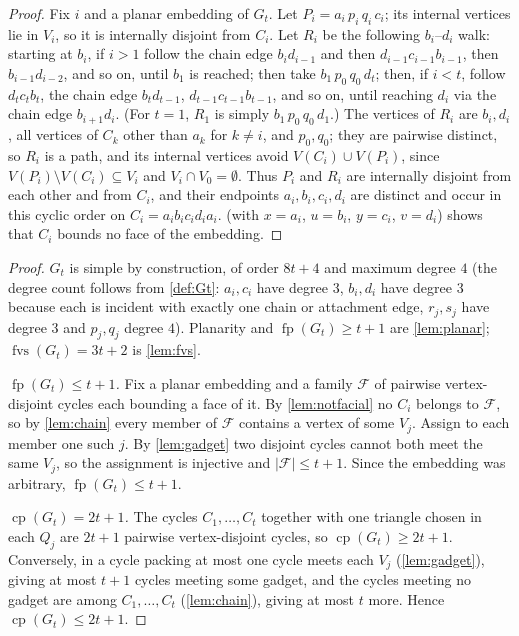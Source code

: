 \documentclass[11pt,a4paper]{article}
\theoremstyle{plain}
\theoremstyle{definition}
\theoremstyle{remark}
\newcommand{\fvs}{\operatorname{fvs}}
\newcommand{\cp}{\operatorname{cp}}
\newcommand{\fp}{\operatorname{fp}}
\newcommand{\Gtt}{G_t}
\begin{document}
\label{pf:notfacial}
\lemnotfacial*
\begin{proof}
Fix $i$ and a planar embedding of $\Gtt$. Let $P_i=a_i\,p_i\,q_i\,c_i$; its internal vertices lie in $V_i$, so it is internally disjoint from $C_i$. Let $R_i$ be the following $b_i$--$d_i$ walk: starting at $b_i$, if $i>1$ follow the chain edge $b_id_{i-1}$ and then $d_{i-1}c_{i-1}b_{i-1}$, then $b_{i-1}d_{i-2}$, and so on, until $b_1$ is reached; then take $b_1\,p_0\,q_0\,d_t$; then, if $i<t$, follow $d_tc_tb_t$, the chain edge $b_td_{t-1}$, $d_{t-1}c_{t-1}b_{t-1}$, and so on, until reaching $d_i$ via the chain edge $b_{i+1}d_i$. (For $t=1$, $R_1$ is simply $b_1\,p_0\,q_0\,d_1$.) The vertices of $R_i$ are $b_i,d_i$, all vertices of $C_k$ other than $a_k$ for $k\ne i$, and $p_0,q_0$; they are pairwise distinct, so $R_i$ is a path, and its internal vertices avoid $V(C_i)\cup V(P_i)$, since $V(P_i)\setminus V(C_i)\subseteq V_i$ and $V_i\cap V_0=\emptyset$. Thus $P_i$ and $R_i$ are internally disjoint from each other and from $C_i$, and their endpoints $a_i,b_i,c_i,d_i$ are distinct and occur in this cyclic order on $C_i=a_ib_ic_id_ia_i$.  (with $x=a_i$, $u=b_i$, $y=c_i$, $v=d_i$) shows that $C_i$ bounds no face of the embedding.
\end{proof}

\label{pf:main}
\thmmain*
\begin{proof}
$\Gtt$ is simple by construction, of order $8t+4$ and maximum degree $4$ (the degree count follows from \cref{def:Gt}: $a_i,c_i$ have degree $3$, $b_i,d_i$ have degree $3$ because each is incident with exactly one chain or attachment edge, $r_j,s_j$ have degree $3$ and $p_j,q_j$ degree $4$). Planarity and $\fp(\Gtt)\ge t+1$ are \cref{lem:planar}; $\fvs(\Gtt)=3t+2$ is \cref{lem:fvs}.

\emph{$\fp(\Gtt)\le t+1$.} Fix a planar embedding and a family $\mathcal F$ of pairwise vertex-disjoint cycles each bounding a face of it. By \cref{lem:notfacial} no $C_i$ belongs to $\mathcal F$, so by \cref{lem:chain} every member of $\mathcal F$ contains a vertex of some $V_j$. Assign to each member one such $j$. By \cref{lem:gadget} two disjoint cycles cannot both meet the same $V_j$, so the assignment is injective and $|\mathcal F|\le t+1$. Since the embedding was arbitrary, $\fp(\Gtt)\le t+1$.

\emph{$\cp(\Gtt)=2t+1$.} The cycles $C_1,\dots,C_t$ together with one triangle chosen in each $Q_j$ are $2t+1$ pairwise vertex-disjoint cycles, so $\cp(\Gtt)\ge2t+1$. Conversely, in a cycle packing at most one cycle meets each $V_j$ (\cref{lem:gadget}), giving at most $t+1$ cycles meeting some gadget, and the cycles meeting no gadget are among $C_1,\dots,C_t$ (\cref{lem:chain}), giving at most $t$ more. Hence $\cp(\Gtt)\le2t+1$.
\end{proof}
\end{document}
